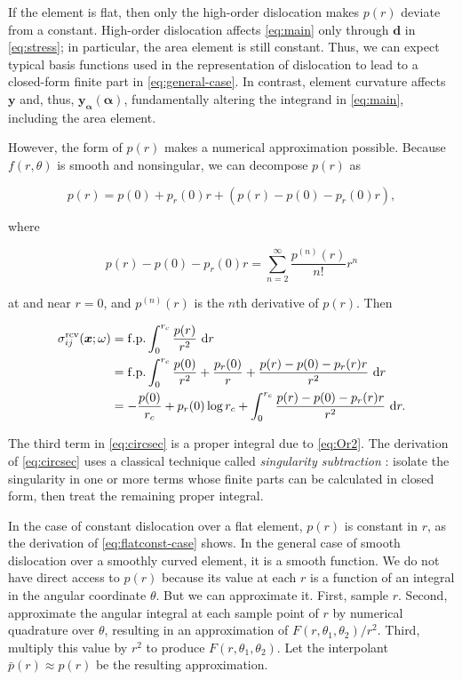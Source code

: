 \documentclass[11pt]{article}
\renewcommand{\vec}[1]{\boldsymbol{#1}}
\newcommand{\rmax}{r_c}
\begin{document}
If the element is flat,
then only the high-order dislocation makes $p(r)$ deviate from a constant.
High-order dislocation affects \eqref{eq:main} only through $\vec{d}$ in \eqref{eq:stress};
in particular, the area element is still constant.
Thus, we can expect typical basis functions used in the representation of dislocation
to lead to a closed-form finite part in \eqref{eq:general-case}.
In contrast, element curvature affects $\vec{y}$ and, thus, $\vec{y}_{\vec{\alpha}}(\vec{\alpha})$,
fundamentally altering the integrand in \eqref{eq:main},
including the area element.

However, the form of $p(r)$ makes a numerical approximation possible.
Because $f(r,\theta)$ is smooth and nonsingular,
we can decompose $p(r)$ as
\begin{linenomath}\begin{equation*}
  p(r) = p(0) + p_r(0) r + (p(r) - p(0) - p_r(0) r),
\end{equation*}\end{linenomath}
where
\begin{linenomath}\begin{equation} \label{eq:Or2}
  p(r) - p(0) - p_r(0) r = \sum_{n=2}^{\infty} \frac{p^{(n)}(r)}{n!} r^n
\end{equation}\end{linenomath}
at and near $r=0$, and $p^{(n)}(r)$ is the $n$th derivative of $p(r)$.
Then
\begin{linenomath}\begin{align}
  \sigma_{ij}^\mathrm{rcv}(\vec{x}; \omega)
  &= \mathrm{f.p.} \int_0^{\rmax}
    \frac{p(r)}{r^2} \
    \mathrm{d} r \notag \\
  &= \mathrm{f.p.} \int_0^{\rmax}
    \frac{p(0)}{r^2} + \frac{p_r(0)}{r} + \frac{p(r) - p(0) - p_r(r) r}{r^2} \
    \mathrm{d} r \notag \\
  &= -\frac{p(0)}{\rmax} + p_r(0) \log \rmax +
    \int_0^{\rmax} \frac{p(r) - p(0) - p_r(r) r}{r^2} \ \mathrm{d} r. \label{eq:circsec}
\end{align}\end{linenomath}
The third term in \eqref{eq:circsec} is a proper integral due to \eqref{eq:Or2}.
The derivation of \eqref{eq:circsec} uses a classical technique called
\emph{singularity subtraction} \citep[e.g.][]{davis2007methods,klockner2013quadrature,kanduvc2022isoparametric}:
isolate the singularity in one or more terms whose finite parts can be calculated in closed form,
then treat the remaining proper integral.

In the case of constant dislocation over a flat element, $p(r)$ is constant in $r$,
as the derivation of \eqref{eq:flatconst-case} shows.
In the general case of smooth dislocation over a smoothly curved element,
it is a smooth function.
We do not have direct access to $p(r)$
because its value at each $r$ is a function of an integral in the angular coordinate $\theta$.
But we can approximate it.
First, sample $r$.
Second, approximate the angular integral at each sample point of $r$
by numerical quadrature over $\theta$,
resulting in an approximation of $F(r,\theta_1,\theta_2)/r^2$.
Third, multiply this value by $r^2$ to produce $F(r,\theta_1,\theta_2)$.
Let the interpolant $\bar{p}(r) \approx p(r)$ be the resulting approximation.
\end{document}
